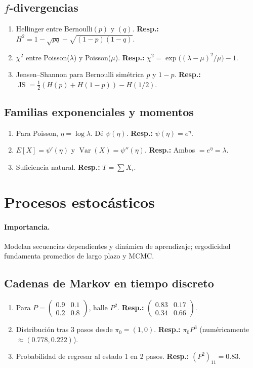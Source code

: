 	\subsection*{$f$-divergencias}
	\begin{enumerate}
		\item Hellinger entre Bernoulli$(p)$ y $(q)$. \textbf{Resp.:} $H^2=1-\sqrt{pq}-\sqrt{(1-p)(1-q)}$.
		\item $\chi^2$ entre Poisson($\lambda$) y Poisson($\mu$). \textbf{Resp.:} $\chi^2=\exp\!\big((\lambda-\mu)^2/\mu\big)-1$.
		\item Jensen--Shannon para Bernoulli simétrica $p$ y $1-p$. \textbf{Resp.:} $\operatorname{JS}=\tfrac12(H(p)+H(1-p))-H(1/2)$.
	\end{enumerate}
	
	\subsection*{Familias exponenciales y momentos}
	\begin{enumerate}
		\item Para Poisson, $\eta=\log\lambda$. Dé $\psi(\eta)$. \textbf{Resp.:} $\psi(\eta)=e^{\eta}$.
		\item $E[X]=\psi'(\eta)$ y $\operatorname{Var}(X)=\psi''(\eta)$. \textbf{Resp.:} Ambos $=e^{\eta}=\lambda$.
		\item Suficiencia natural. \textbf{Resp.:} $T=\sum X_i$.
	\end{enumerate}
	
	\section{Procesos estocásticos}
	\paragraph{Importancia.} Modelan secuencias dependientes y dinámica de aprendizaje; ergodicidad fundamenta promedios de largo plazo y MCMC.
	
	\subsection*{Cadenas de Markov en tiempo discreto}
	\begin{enumerate}
		\item Para $P=\begin{pmatrix}0.9&0.1\\0.2&0.8\end{pmatrix}$, halle $P^2$. \textbf{Resp.:} $\begin{pmatrix}0.83&0.17\\0.34&0.66\end{pmatrix}$.
		\item Distribución tras 3 pasos desde $\pi_0=(1,0)$. \textbf{Resp.:} $\pi_0P^3$ (numéricamente $\approx(0.778,0.222)$).
		\item Probabilidad de regresar al estado 1 en 2 pasos. \textbf{Resp.:} $(P^2)_{11}=0.83$.
	\end{enumerate}
	
